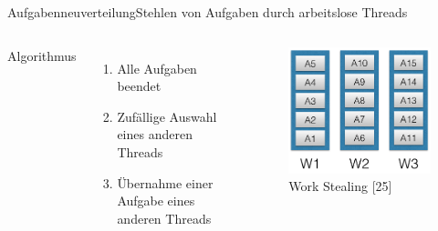 \documentclass{beamer}
\begin{document}
\begin{frame}{Aufgabenneuverteilung}{Stehlen von Aufgaben durch arbeitslose Threads}
\begin{columns}

        Algorithmus
        \begin{enumerate}
        \item Alle Aufgaben beendet
        \item Zuf\"allige Auswahl eines anderen Threads
        \item \"Ubernahme einer Aufgabe eines anderen Threads
        \end{enumerate}

        \begin{figure}
        \centering
        \includegraphics[width=1\columnwidth]{./assets/init.png}
        \caption{Work Stealing \cite{Herlihy1}[25]}
        \label{fig:my_label}
        \end{figure}
        
        
    
\end{columns}
\end{frame}
\end{document}
